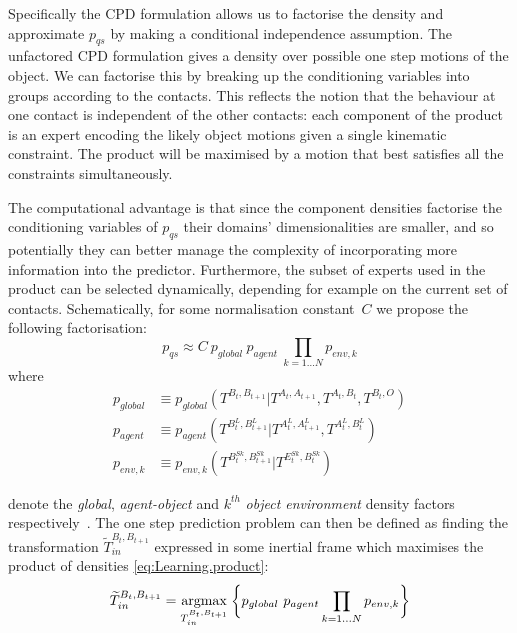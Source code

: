 Specifically the CPD formulation allows us to factorise the density
and approximate $p_{qs}$ by making a conditional independence
assumption. The unfactored CPD formulation gives a density over
possible one step motions of the object. We can
factorise this by breaking up the conditioning variables into groups
according to the contacts. This reflects the notion that the behaviour
at one contact is independent of the other contacts: each component of the
product is an expert encoding the likely object motions given a single
kinematic constraint. The product will be maximised by a
motion that best satisfies all the constraints simultaneously.

The computational advantage is that since the component
densities factorise the conditioning variables of $p_{qs}$ their
domains' dimensionalities are smaller, and so potentially they can
better manage the complexity of incorporating more information into
the predictor.  Furthermore, the subset of experts used in the product can be selected dynamically, depending for example on the current set of contacts. Schematically, for some normalisation constant~$C$ we propose the following factorisation:
\begin{equation}
p_{qs} \approx C\ p_{global}\ p_{agent}\ \mathop{\prod}_{k=1 \ldots N}{ p_{env,k}}
\label{eq:Learning.product}
\end{equation}
\noindent where
\begin{subequations}
\begin{align}
p_{global} &\equiv p_{global}(T^{B_{t}, B_{t+1}}|T^{A_{t}, A_{t+1}}, T^{A_t, B_t}, T^{B_t, O})
\label{eq:Learning.densityglobal} \\
p_{agent} &\equiv p_{agent}(T^{B^{L}_{t}, B^{L}_{t+1}}|T^{A^{L}_{t}, A^{L}_{t+1}}, T^{A^{L}_t, B^{L}_t})
\label{eq:Learning.densitylocal} \\
p_{env,k} &\equiv p_{env,k}(T^{B^{Sk}_t, B^{Sk}_{t+1}} | T^{E^{Sk}_t,B^{Sk}_t})
\label{eq:Learning.densityenv}
\end{align}
\end{subequations}

\noindent denote the \textit{global}, \textit{agent-object} and
$k^{th}$ \textit{object environment} density factors
respectively~\citep{kopicki_prediction_2009, kopicki_prediction_2010}. 
The one step prediction problem can then be defined as finding the
transformation $\widetilde{T}_{in}^{B_{t}, B_{t+1}}$ expressed in some inertial frame which maximises the product of densities \eqref{eq:Learning.product}:
\begin{equation}
\widetilde{T}_{in}^{B_{t}, B_{t+1}} = \underset{T_{in}^{B_{t}, B_{t+1}}}{\operatorname{argmax}}\medspace \bigg\lbrace
p_{global}\  p_{agent} \mathop{\prod}_{k=1 \ldots N}{ p_{env,k} }
\bigg\rbrace
\label{eq:Learning.MultiFactorProduct}
\end{equation}

